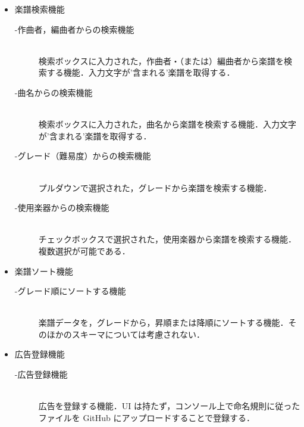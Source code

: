 \begin{itemize}
    \item 楽譜検索機能
          \begin{description}
              \item[-作曲者，編曲者からの検索機能]\mbox{}\\
              検索ボックスに入力された，作曲者・（または）編曲者から楽譜を検索する機能．入力文字が'含まれる'楽譜を取得する．
              \item[-曲名からの検索機能] \mbox{}\\
                  検索ボックスに入力された，曲名から楽譜を検索する機能．入力文字が'含まれる'楽譜を取得する．
              \item[-グレード（難易度）からの検索機能] \mbox{}\\
                  プルダウンで選択された，グレードから楽譜を検索する機能．
              \item[-使用楽器からの検索機能] \mbox{}\\
                  チェックボックスで選択された，使用楽器から楽譜を検索する機能．複数選択が可能である．
          \end{description}
    \item 楽譜ソート機能
          \begin{description}
              \item[-グレード順にソートする機能] \mbox{}\\
                  楽譜データを，グレードから，昇順または降順にソートする機能．そのほかのスキーマについては考慮されない．
          \end{description}
    \item 広告登録機能
          \begin{description}
              \item[-広告登録機能]\mbox{}\\
              広告を登録する機能．UI は持たず，コンソール上で命名規則に従ったファイルを
              GitHub にアップロードすることで登録する．
          \end{description}
\end{itemize}